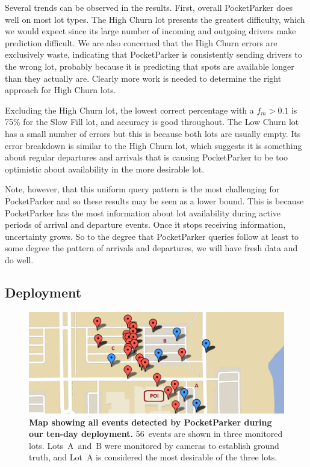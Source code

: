 Several trends can be observed in the results. First, overall PocketParker
does well on most lot types. The High Churn lot presents the greatest
difficulty, which we would expect since its large number of incoming and
outgoing drivers make prediction difficult. We are also concerned that the
High Churn errors are exclusively waste, indicating that PocketParker is
consistently sending drivers to the wrong lot, probably because it is
predicting that spots are available longer than they actually are. Clearly
more work is needed to determine the right approach for High Churn lots.

Excluding the High Churn lot, the lowest correct percentage with a $f_m >
0.1$ is 75\% for the Slow Fill lot, and accuracy is good throughout. The Low
Churn lot has a small number of errors but this is because both lots are
usually empty. Its error breakdown is similar to the High Churn lot, which
suggests it is something about regular departures and arrivals that is
causing PocketParker to be too optimistic about availability in the more
desirable lot.

Note, however, that this uniform query pattern is the most challenging for
PocketParker and so these results may be seen as a lower bound. This is
because PocketParker has the most information about lot availability during
active periods of arrival and departure events. Once it stops receiving
information, uncertainty grows. So to the degree that PocketParker queries
follow at least to some degree the pattern of arrivals and departures, we
will have fresh data and do well.

\subsection{Deployment}

\begin{figure}
\centering
\includegraphics[width=\textwidth]{./figures/detectedEventsOnMap.pdf}

\caption{\textbf{Map showing all events detected by PocketParker during our
ten-day deployment.} 56~events are shown in three monitored lots.
Lots~A~and~B were monitored by cameras to establish ground truth, and Lot~A
is considered the most desirable of the three lots.}

\label{fig-events}
\end{figure}

